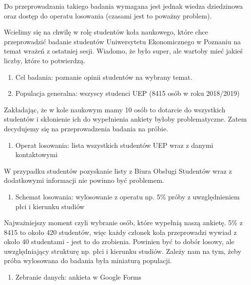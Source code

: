 \documentclass[
]{book}
\providecommand{\tightlist}{%
  \setlength{\itemsep}{0pt}\setlength{\parskip}{0pt}}
\begin{document}
Do przeprowadzania takiego badania wymagana jest jednak wiedza dziedzinowa oraz dostęp do operatu losowania (czasami jest to poważny problem).

Wcielimy się na chwilę w rolę studentów koła naukowego, które chce przeprowadzić badanie studentów Uniwersytetu Ekonomicznego w Poznaniu na temat wrażeń z ostatniej sesji. Wiadomo, że było super, ale wartoby mieć jakieś liczby, które to potwierdzą.

\begin{enumerate}
\def\labelenumi{\arabic{enumi}.}
\tightlist
\item
  Cel badania: poznanie opinii studentów na wybrany temat.
\item
  Populacja generalna: wszyscy studenci UEP (8415 osób w roku 2018/2019)
\end{enumerate}

Zakładając, że w kole naukowym mamy 10 osób to dotarcie do wszystkich studentów i skłonienie ich do wypełnienia ankiety byłoby problematyczne. Zatem decydujemy się na przeprowadzenia badania na próbie.

\begin{enumerate}
\def\labelenumi{\arabic{enumi}.}
\setcounter{enumi}{2}
\tightlist
\item
  Operat losowania: lista wszystkich studentów UEP wraz z danymi kontaktowymi
\end{enumerate}

W przypadku studentów pozyskanie listy z Biura Obsługi Studentów wraz z dodatkowymi informacji nie powinno być problemem.

\begin{enumerate}
\def\labelenumi{\arabic{enumi}.}
\setcounter{enumi}{3}
\tightlist
\item
  Schemat losowania: wylosowanie z operatu np. 5\% próby z uwzględnieniem płci i kierunku studiów
\end{enumerate}

Najważniejszy moment czyli wybranie osób, które wypełnią naszą ankietę. 5\% z 8415 to około 420 studentów, więc każdy członek koła przeprowadzi wywiad z około 40 studentami - jest to do zrobienia. Powinien być to dobór losowy, ale uwzględniający strukturę np. płci i kierunku studiów. Zależy nam na tym, żeby próba wylosowana do badania była miniaturą populacji.

\begin{enumerate}
\def\labelenumi{\arabic{enumi}.}
\setcounter{enumi}{4}
\tightlist
\item
  Zebranie danych: ankieta w Google Forms
\end{enumerate}
\end{document}
